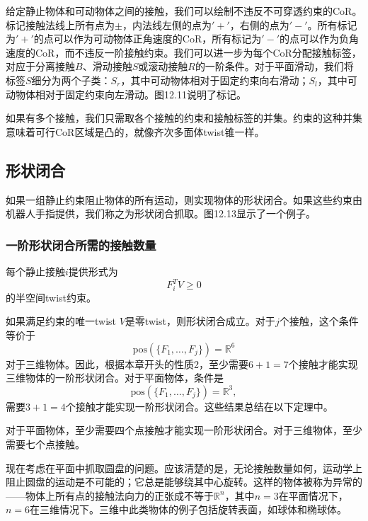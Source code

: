 \documentclass[12pt,a4paper]{article}
\begin{document}
给定静止物体和可动物体之间的接触，我们可以绘制不违反不可穿透约束的CoR。标记接触法线上所有点为$\pm$，内法线左侧的点为$'+'$，右侧的点为$'-'$。所有标记为$'+'$的点可以作为可动物体正角速度的CoR，所有标记为$'-'$的点可以作为负角速度的CoR，而不违反一阶接触约束。我们可以进一步为每个CoR分配接触标签，对应于分离接触$B$、滑动接触$S$或滚动接触$R$的一阶条件。对于平面滑动，我们将标签$S$细分为两个子类：$S_r$，其中可动物体相对于固定约束向右滑动；$S_l$，其中可动物体相对于固定约束向左滑动。图12.11说明了标记。

如果有多个接触，我们只需取各个接触的约束和接触标签的并集。约束的这种并集意味着可行CoR区域是凸的，就像齐次多面体twist锥一样。

\subsection{形状闭合}
\label{subsec:form_closure}

如果一组静止约束阻止物体的所有运动，则实现物体的形状闭合。如果这些约束由机器人手指提供，我们称之为形状闭合抓取。图12.13显示了一个例子。

\subsubsection{一阶形状闭合所需的接触数量}
\label{subsubsec:number_of_contacts_form_closure}

每个静止接触$i$提供形式为
\begin{equation}
F_i^T V \geq 0
\end{equation}
的半空间twist约束。

如果满足约束的唯一twist $V$是零twist，则形状闭合成立。对于$j$个接触，这个条件等价于
\begin{equation}
\text{pos}(\{F_1, \ldots, F_j\}) = \mathbb{R}^6
\end{equation}
对于三维物体。因此，根据本章开头的性质2，至少需要$6 + 1 = 7$个接触才能实现三维物体的一阶形状闭合。对于平面物体，条件是
\begin{equation}
\text{pos}(\{F_1, \ldots, F_j\}) = \mathbb{R}^3,
\end{equation}
需要$3 + 1 = 4$个接触才能实现一阶形状闭合。这些结果总结在以下定理中。

\begin{theorem}[12.6]
对于平面物体，至少需要四个点接触才能实现一阶形状闭合。对于三维物体，至少需要七个点接触。
\end{theorem}

现在考虑在平面中抓取圆盘的问题。应该清楚的是，无论接触数量如何，运动学上阻止圆盘的运动是不可能的；它总是能够绕其中心旋转。这样的物体被称为异常的——物体上所有点的接触法向力的正张成不等于$\mathbb{R}^n$，其中$n = 3$在平面情况下，$n = 6$在三维情况下。三维中此类物体的例子包括旋转表面，如球体和椭球体。
\end{document}
